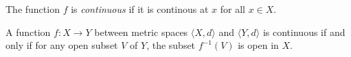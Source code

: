 \noindent The function $f$ is \emph{continuous} if it is continous at $x$ for all $x \in X$.

\begin{theorem}
A function $f:X \rightarrow Y$ between metric spaces $\langle X,d \rangle$ and $\langle Y,d \rangle$ is continuous if and only if for any open subset $V$ of $Y$, the subset $f^{-1}(V)$ is open in $X$.
\end{theorem}